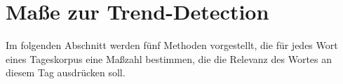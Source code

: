 
\chapter{Maße zur Trend-Detection}
Im folgenden Abschnitt werden fünf Methoden vorgestellt, die für jedes Wort eines Tageskorpus eine Maßzahl bestimmen, die die Relevanz des Wortes an diesem Tag ausdrücken soll.






